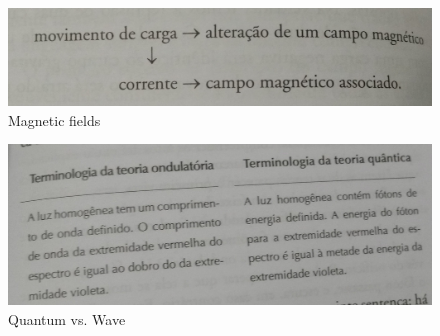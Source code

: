 \documentclass{cornell}
\begin{document}
\begin{figure}[!t]
\centering
\includegraphics[width=1.0\linewidth]{images/teof03.jpg}
\caption{Magnetic fields }
\label{teof03}
\end{figure}

\begin{figure}[!t]
\centering
\includegraphics[width=1.0\linewidth]{images/teof04.jpg}
\caption{Quantum vs. Wave }
\label{teof04}
\end{figure}

\end{document}
